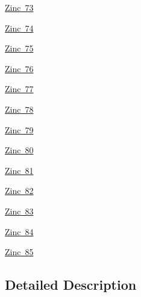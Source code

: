 \begin{DoxyCompactItemize}
\mbox{\hyperlink{group___isotope_const-_zinc-_zn73}{Zinc 73}}
\item 
\mbox{\hyperlink{group___isotope_const-_zinc-_zn74}{Zinc 74}}
\item 
\mbox{\hyperlink{group___isotope_const-_zinc-_zn75}{Zinc 75}}
\item 
\mbox{\hyperlink{group___isotope_const-_zinc-_zn76}{Zinc 76}}
\item 
\mbox{\hyperlink{group___isotope_const-_zinc-_zn77}{Zinc 77}}
\item 
\mbox{\hyperlink{group___isotope_const-_zinc-_zn78}{Zinc 78}}
\item 
\mbox{\hyperlink{group___isotope_const-_zinc-_zn79}{Zinc 79}}
\item 
\mbox{\hyperlink{group___isotope_const-_zinc-_zn80}{Zinc 80}}
\item 
\mbox{\hyperlink{group___isotope_const-_zinc-_zn81}{Zinc 81}}
\item 
\mbox{\hyperlink{group___isotope_const-_zinc-_zn82}{Zinc 82}}
\item 
\mbox{\hyperlink{group___isotope_const-_zinc-_zn83}{Zinc 83}}
\item 
\mbox{\hyperlink{group___isotope_const-_zinc-_zn84}{Zinc 84}}
\item 
\mbox{\hyperlink{group___isotope_const-_zinc-_zn85}{Zinc 85}}
\end{DoxyCompactItemize}


\subsection{Detailed Description}
